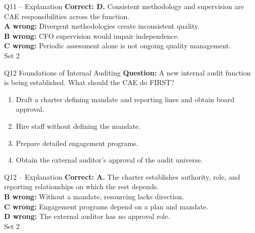 \documentclass[aspectratio=169,10pt]{beamer}
\begin{document}
\begin{frame}[t]{Q11 -- Explanation}
	\footnotesize
	\textbf{Correct: D.} Consistent methodology and supervision are CAE responsibilities across the function. \\[5pt]
\textbf{A wrong:} Divergent methodologies create inconsistent quality. \\[3pt]
\textbf{B wrong:} CFO supervision would impair independence. \\[3pt]
\textbf{C wrong:} Periodic assessment alone is not ongoing quality management. \\[3pt]
	\vfill {\tiny Set 2}
\end{frame}

\begin{frame}[t]{Q12 \hfill {\scriptsize Foundations of Internal Auditing}}
	\small
	\textbf{Question:} A new internal audit function is being established. What should the CAE do FIRST?
	\begin{enumerate}[label=\Alph*.,itemsep=1pt,topsep=3pt]
			\item Draft a charter defining mandate and reporting lines and obtain board approval.
			\item Hire staff without defining the mandate.
			\item Prepare detailed engagement programs.
			\item Obtain the external auditor's approval of the audit universe.
	\end{enumerate}
\end{frame}

\begin{frame}[t]{Q12 -- Explanation}
	\footnotesize
	\textbf{Correct: A.} The charter establishes authority, role, and reporting relationships on which the rest depends. \\[5pt]
\textbf{B wrong:} Without a mandate, resourcing lacks direction. \\[3pt]
\textbf{C wrong:} Engagement programs depend on a plan and mandate. \\[3pt]
\textbf{D wrong:} The external auditor has no approval role. \\[3pt]
	\vfill {\tiny Set 2}
\end{frame}
\end{document}
